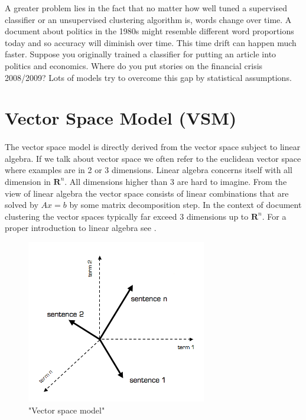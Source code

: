     A greater problem lies in the fact that no matter how well tuned a supervised classifier or an unsupervised clustering algorithm is, words change over time. A document about politics in the 1980s might resemble different word proportions today and so accuracy will diminish over time. This time drift can happen much faster. Suppose you originally trained a classifier for putting an article into politics and economics. Where do you put stories on the financial crisis 2008/2009? Lots of models try to overcome this gap by statistical assumptions.

\newpage{}
\section{Vector Space Model (VSM)}
  
  \paragraph{}
    The vector space model is directly derived from the vector space subject to linear algebra. If we talk about vector space we often refer to the euclidean vector space where examples are in 2 or 3 dimensions. Linear algebra concerns itself with all dimension in $\mathbf{R}^{n}$. All dimensions higher than 3 are hard to imagine. From the view of linear algebra the vector space consists of linear combinations that are solved by $Ax = b$ by some matrix decomposition step. In the context of document clustering the vector spaces typically far exceed 3 dimensions up to $\mathbf{R}^{n}$. For a proper introduction to linear algebra see \cite{Strang2009}.

  \begin{figure}[h!]
    \centering
      \includegraphics[width=0.7\textwidth]{vsm.png}
      \caption{"Vector space model"}
      \label{vsm_pic}
  \end{figure}

